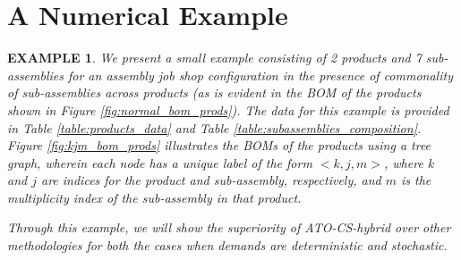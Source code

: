 \documentclass[twoside,onecolumn,12pt,letterpaper]{article}
\newtheorem{example}{EXAMPLE}
\begin{document}
\section{A Numerical Example \label{sec:numerical_example}}
\begin{example}
\label{ex:1}
We present a small example consisting of 2 products and 7 sub-assemblies for an assembly job shop configuration in the presence of commonality of sub-assemblies across products (as is evident in the BOM of the products shown in Figure \ref{fig:normal_bom_prods}). The data for this example is provided in Table \ref{table:products_data} and Table \ref{table:subassemblies_composition}. Figure \ref{fig:kjm_bom_prods} illustrates the BOMs of the products using a tree graph, wherein each node has a unique label of the form ${<}k,j,m{>}$, where $k$ and $j$ are indices for the product and sub-assembly, respectively, and $m$ is the multiplicity index of the sub-assembly in that product.

Through this example, we will show the superiority of ATO-CS-hybrid over other methodologies for both the cases when demands are deterministic and stochastic.


\end{example}
\end{document}
